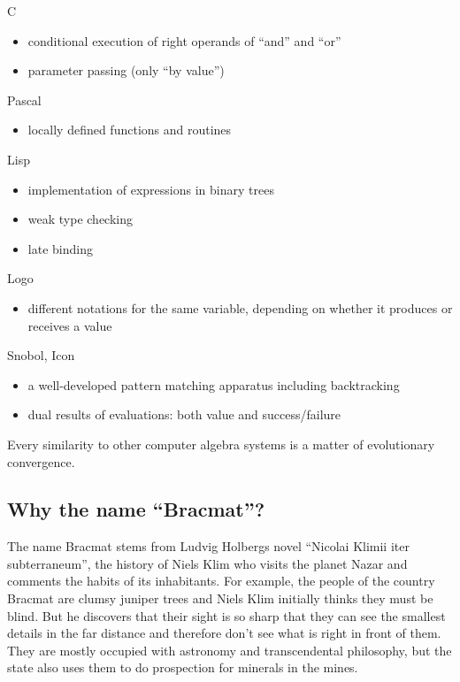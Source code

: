 \documentclass[12pt]{article}
\begin{document}
\begin{description}
\item C
  \begin{itemize}
  \item conditional execution of right operands of ``and'' and ``or''
  \item parameter passing (only ``by value'')
  \end{itemize}
  
\item Pascal
  \begin{itemize}
  \item locally defined functions and routines
  \end{itemize}

\item Lisp
  \begin{itemize}
  \item implementation of expressions in binary trees
  \item weak type checking
  \item late binding
  \end{itemize}
  
\item Logo
  \begin{itemize}
  \item different notations for the same variable, depending on whether
    it produces or receives a value
  \end{itemize}
  
\item Snobol, Icon
  \begin{itemize}
  \item a well-developed pattern matching apparatus including
    backtracking
  \item dual results of evaluations: both value and success/failure
  \end{itemize}
\end{description}

Every similarity to other computer algebra systems is a matter of
evolutionary convergence.

\subsection{Why the name ``Bracmat''?}

The name Bracmat stems from Ludvig Holbergs novel ``Nicolai Klimii iter
subterraneum'', the history of Niels Klim who visits the planet Nazar
and comments the habits of its inhabitants. For example, the people of
the country Bracmat are clumsy juniper trees and Niels Klim initially
thinks they must be blind. But he discovers that their
sight is so sharp that they can see the smallest details in the far
distance and therefore don't see what is right in front of them. They
are mostly occupied with astronomy and transcendental philosophy, but
the state also uses them to do prospection for minerals in the mines.
\end{document}
